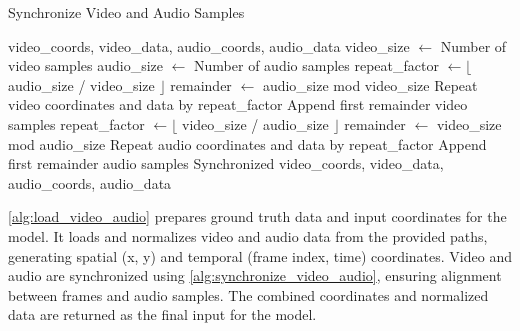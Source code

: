 \begin{algorithm}
    \caption{Synchronize Video and Audio Samples}
    \label{alg:synchronize_video_audio}
    \begin{algorithmic}[1]
    \REQUIRE video\_coords, video\_data, audio\_coords, audio\_data
    \STATE video\_size $\gets$ Number of video samples
    \STATE audio\_size $\gets$ Number of audio samples
        \STATE repeat\_factor $\gets \lfloor$ audio\_size / video\_size $\rfloor$
        \STATE remainder $\gets$ audio\_size mod video\_size
        \STATE Repeat video coordinates and data by repeat\_factor
            \STATE Append first remainder video samples
        \ENDIF
        \STATE repeat\_factor $\gets \lfloor$ video\_size / audio\_size $\rfloor$
        \STATE remainder $\gets$ video\_size mod audio\_size
        \STATE Repeat audio coordinates and data by repeat\_factor
            \STATE Append first remainder audio samples
        \ENDIF
    \ENDIF
    \RETURN Synchronized video\_coords, video\_data, audio\_coords, audio\_data
    \end{algorithmic}
\end{algorithm}

\autoref{alg:load_video_audio} prepares ground truth data and input coordinates for the model. It loads and normalizes video and audio data from the provided paths, generating spatial (x, y) and temporal (frame index, time) coordinates. Video and audio are synchronized using \autoref{alg:synchronize_video_audio}, ensuring alignment between frames and audio samples. The combined coordinates and normalized data are returned as the final input for the model.

